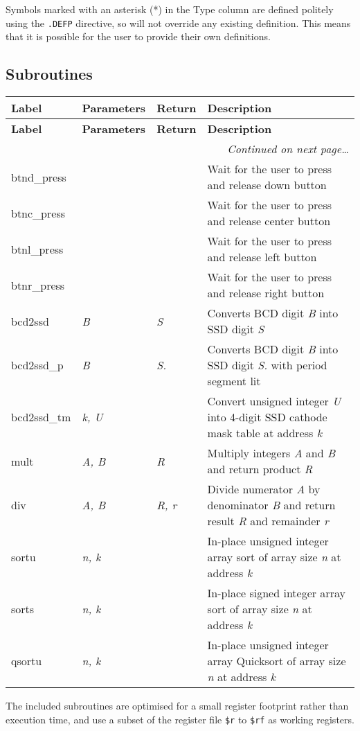 \documentclass[12pt,twoside]{report}
\begin{document}
Symbols marked with an asterisk (*) in the Type column are defined
politely using the \texttt{.DEFP} directive, so will not override any
existing definition. This means that it is possible for the user to
provide their own definitions.

\subsection{Subroutines}

{\scriptsize
\begin{longtable}{ | l | l | l | l | }
  \hline
  \textbf{Label} & \textbf{Parameters} & \textbf{Return} & \textbf{Description} \\
  \hline
\endfirsthead
  \hline
  \textbf{Label} & \textbf{Parameters} & \textbf{Return} & \textbf{Description} \\
  \hline

\endhead
  \hline
  \multicolumn{4}{r}{\emph{Continued on next page\ldots}}
\endfoot

\endlastfoot
 \hline
 btnu\_press & & & Wait for the user to press and release up button \\
 btnd\_press & & & Wait for the user to press and release down button \\
 btnc\_press & & & Wait for the user to press and release center button \\
 btnl\_press & & & Wait for the user to press and release left button \\
 btnr\_press & & & Wait for the user to press and release right button \\
 bcd2ssd & \textit{B} & \textit{S} & Converts BCD digit \textit{B} into SSD digit \textit{S} \\
 bcd2ssd\_p & \textit{B} & \textit{S.} & Converts BCD digit \textit{B} into SSD digit \textit{S.} with period segment lit \\
 bcd2ssd\_tm & \textit{k, U} & & Convert unsigned integer \textit{U} into 4-digit SSD cathode mask table at address \textit{k} \\
 mult & \textit{A, B} & \textit{R} & Multiply integers \textit{A} and \textit{B} and return product \textit{R} \\
 div & \textit{A, B} & \textit{R, r} & Divide numerator \textit{A} by denominator \textit{B} and return result \textit{R} and remainder \textit{r} \\
 sortu & \textit{n, k} & & In-place unsigned integer array sort of array size \textit{n} at address \textit{k} \\
 sorts & \textit{n, k} & & In-place signed integer array sort of array size \textit{n} at address \textit{k} \\
 qsortu & \textit{n, k} & & In-place unsigned integer array Quicksort of array size \textit{n} at address \textit{k} \\
 \hline
\end{longtable}}

The included subroutines are optimised for a small register footprint
rather than execution time, and use a subset of the register file
\texttt{\$r} to \texttt{\$rf} as working registers.
\end{document}

